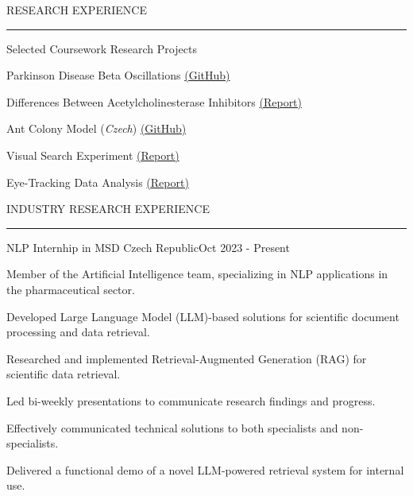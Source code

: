 \documentclass{resume} %
\renewenvironment{rSection}[1]{
\sectionskip
\textcolor{CarnegieMellonRed}{\MakeUppercase{#1}}
\sectionlineskip
\hrule
\begin{list}{}{
\setlength{\leftmargin}{1.5em}
}
\item[]
}{
\end{list}
}
\begin{document}
\begin{rSection}{Research Experience}
\begin{rProject}{\large Selected Coursework Research Projects}{}
{}{}{}
    \item Parkinson Disease Beta Oscillations 
    {\href{https://github.com/dbeinhauer/parkinson_disease_project}{(GitHub)}}
    \item Differences Between Acetylcholinesterase Inhibitors
    {\href{https://github.com/dbeinhauer/acetylcholinester_inhibitors/blob/main/TeX/main.pdf}{(Report)}}
    \item Ant Colony Model (\emph{Czech})
    {\href{https://github.com/dbeinhauer/ant_colony_model/tree/main}{(GitHub)}}
    \item Visual Search Experiment 
    {\href{https://raw.githack.com/dbeinhauer/visual_search_experiment/main/visual-search-experiment-report.html}{(Report)}}
    \item Eye-Tracking Data Analysis 
    {\href{https://raw.githack.com/dbeinhauer/etra_challenge/main/etra_challenge_report.html}{(Report)}}
\end{rProject}

\end{rSection}


\begin{rSection}{Industry Research Experience}
\begin{rProject}{\large NLP Internhip in MSD Czech Republic}{Oct 2023 - Present}
{}{}
    \item Member of the Artificial Intelligence team, specializing in NLP applications
    in the pharmaceutical sector.
    \item Developed Large Language Model (LLM)-based solutions for scientific document
    processing and data retrieval.
    \item Researched and implemented Retrieval-Augmented Generation (RAG) 
    for scientific data retrieval.
    \item Led bi-weekly presentations to communicate research findings and progress.
    \item Effectively communicated technical solutions to both specialists and 
    non-specialists.
    \item Delivered a functional demo of a novel LLM-powered retrieval system 
    for internal use.
\end{rProject}

\end{rSection}
\end{document}
